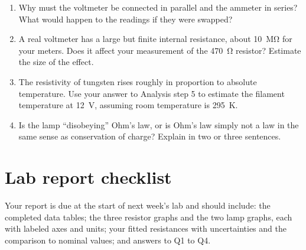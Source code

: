 \documentclass[11pt]{article}
\begin{document}
\begin{enumerate}[label=Q\arabic*.]
  \item Why must the voltmeter be connected in parallel and the ammeter in series? What would happen to the readings if they were swapped?
  \item A real voltmeter has a large but finite internal resistance, about \SI{10}{\mega\ohm} for your meters. Does it affect your measurement of the \SI{470}{\ohm} resistor? Estimate the size of the effect.
  \item The resistivity of tungsten rises roughly in proportion to absolute temperature. Use your answer to Analysis step 5 to estimate the filament temperature at \SI{12}{\volt}, assuming room temperature is \SI{295}{\kelvin}.
  \item Is the lamp ``disobeying'' Ohm's law, or is Ohm's law simply not a law in the same sense as conservation of charge? Explain in two or three sentences.
\end{enumerate}

\section*{Lab report checklist}

Your report is due at the start of next week's lab and should include: the completed data tables; the three resistor graphs and the two lamp graphs, each with labeled axes and units; your fitted resistances with uncertainties and the comparison to nominal values; and answers to Q1 to Q4.
\end{document}
